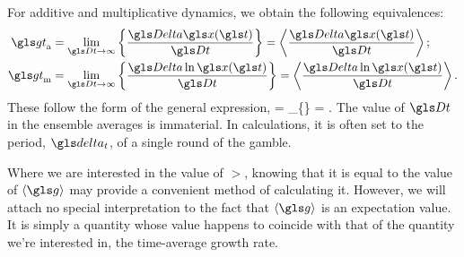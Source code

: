 For additive and multiplicative dynamics, we obtain the following 
equivalences:
\begin{align}
\gt_\text{a} &= \lim_{\Dt\to\infty}\left\{\frac{\D\x(\t)}{\Dt}\right\} = \ave{\frac{\D\x(\t)}{\Dt}}; \elabel{g_bar_a}\\
\gt_\text{m} &= \lim_{\Dt\to\infty}\left\{\frac{\D\ln \x(\t)}{\Dt}\right\} = \ave{\frac{\D\ln \x(\t)}{\Dt}}. \elabel{g_bar_m}
\end{align}
These follow the form of the general expression,
\be
\gt = \lim_{\Dt\to\infty}\left\{\frac{\D \gv(\x(\t))}{\Dt}\right\} = \ave{\frac{\D \gv(\x(\t))}{\Dt}}. 
\ee 
The value of $\Dt$ in the ensemble averages is immaterial. In calculations, 
it is often set to the period, $\dt$, of a single round of the gamble.

Where we are interested in the value of $\gt$, knowing that it is equal 
to the value of $\ave{\g}$ may provide a convenient method of calculating it. 
However, we will attach no special interpretation to the fact that $\ave{\g}$ is 
an expectation value. It is simply a quantity whose value happens to 
coincide with that of the quantity we're interested in, \ie the time-average 
growth rate.

